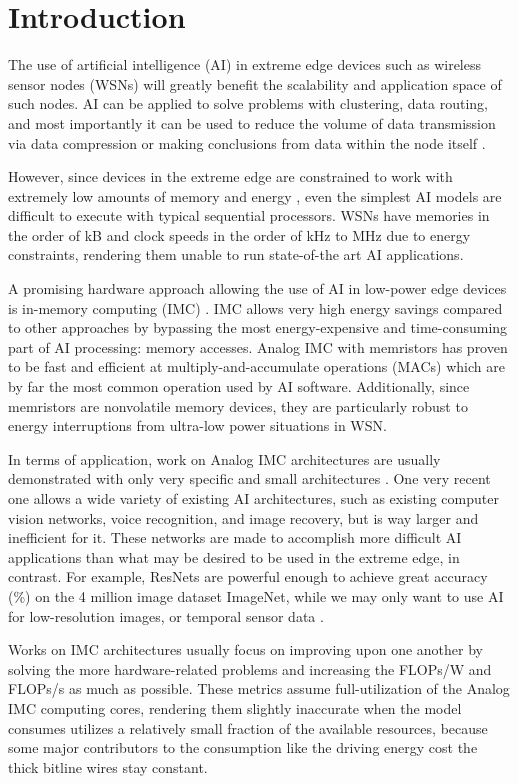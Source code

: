 \chapter{Introduction}

The use of artificial intelligence (AI) in extreme edge devices such as wireless sensor nodes (WSNs) will greatly benefit the scalability and application space of such nodes. AI can be applied to solve problems with clustering, data routing, and most importantly it can be used to reduce the volume of data transmission via data compression or making conclusions from data within the node itself \cite{alsheikh2014machine}.

However, since devices in the extreme edge are constrained to work with extremely low amounts of memory and energy \cite{Ma_2019}, even the simplest AI models are difficult to execute with typical sequential processors. WSNs have memories in the order of kB and clock speeds in the order of kHz to MHz due to energy constraints, rendering them unable to run state-of-the art AI applications.

A promising hardware approach allowing the use of AI in low-power edge devices is in-memory computing (IMC) \cite{Patterson_1997}. IMC allows very high energy savings compared to other approaches by bypassing the most energy-expensive and time-consuming part of AI processing: memory accesses. Analog IMC with memristors has proven to be fast and efficient at multiply-and-accumulate operations (MACs) which are by far the most common operation used by AI software. Additionally, since memristors are nonvolatile memory devices, they are particularly robust to energy interruptions from ultra-low power situations in WSN. 

In terms of application, work on Analog IMC architectures are usually demonstrated with only very specific and small architectures \cite{Xue_2019,Liu_2020,Mochida_2018}. One very recent one allows a wide variety of existing AI architectures, such as existing computer vision networks, voice recognition, and image recovery, but is way larger and inefficient for it. These networks are made to accomplish more difficult AI applications than what may be desired to be used in the extreme edge, in contrast. For example, ResNets are powerful enough to achieve great accuracy (\%) on the 4 million image dataset ImageNet, while we may only want to use AI for low-resolution images, or temporal sensor data \cite{He_2016}. 

Works on IMC architectures usually focus on improving upon one another by solving the more hardware-related problems and increasing the FLOPs/W and FLOPs/s as much as possible. These metrics assume full-utilization of the Analog IMC computing cores, rendering them slightly inaccurate when the model consumes utilizes a relatively small fraction of the available resources, because some major contributors to the consumption like the driving energy cost the thick bitline wires stay constant.

